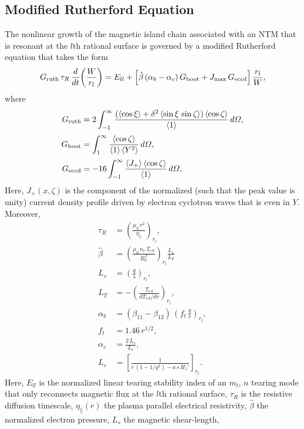 \documentclass[12pt,prb,aps]{revtex4-1}
\begin{document}
\subsection{Modified Rutherford Equation}
The nonlinear growth of the magnetic island  chain associated with an NTM that is resonant at the $l$th rational surface is governed by a modified Rutherford equation that takes the form\,\cite{ntm1,ntm4,island,boot,fitz}
\begin{equation}\label{eruth}
G_{\rm ruth}\,\tau_R\,\frac{d}{dt}\!\left(\frac{W}{r_l}\right) = E_{ll} +\left[\hat{\beta}\,(\alpha_b-\alpha_c)\,G_{\rm boot} + J_{\rm max}\,G_{\rm eccd}\right]
\frac{r_l}{W},
\end{equation}
where
\begin{align}
G_{\rm ruth} &= 2\int_{-1}^\infty \frac{(\langle\cos\xi\rangle + \delta^2\,\langle \sin\xi\,\sin\zeta\rangle)\,\langle \cos\zeta\rangle}{\langle 1\rangle}\,d{\mit\Omega},\\[0.5ex]
G_{\rm boot} &= \int_1^\infty \frac{\langle \cos\zeta\rangle}{\langle 1\rangle\,\langle Y^2\rangle}\,d{\mit\Omega},\\[0.5ex]
G_{\rm eccd} &= - 16\int_{-1}^\infty \frac{\langle J_+\rangle\,\langle \cos\zeta\rangle}{\langle 1\rangle}\,d{\mit\Omega},\label{geccd}
\end{align}
Here,  $J_+(x,\zeta)$ is the component of the normalized  (such that the peak value is unity) current density profile driven by electron cyclotron waves that is even in $Y$. 
Moreover, 
\begin{align}
\tau_R &= \left(\frac{\mu_0\,r^2}{\eta_\parallel}\right)_{r_l},\\[0.5ex]
\hat{\beta} &= \left(\frac{\mu_0\,n_e\,T_{e\,0}}{B_0^{\,2}}\right)_{r_l}\frac{L_s}{L_T}\,\\[0.5ex]
L_s&=\left(\frac{q}{s}\right)_{r_l},\\[0.5ex]
L_T &= -\left(\frac{T_{e\,0}}{dT_{e\,0}/dr}\right)_{r_l},\\[0.5ex]
\alpha_b &=(\beta_{11}-\beta_{12})\, \left(f_t\,\frac{q}{r}\right)_{r_l},\\[0.5ex]
f_t&= 1.46\,r^{1/2},\\[0.5ex]
\alpha_c &= \frac{2\,L_s}{L_c},\\[0.5ex]
L_c &= \left[\frac{1}{r\,(1-1/q^2) -a\,s\,H_1'}\right]_{r_l}.
\end{align}
Here, $E_{ll}$ is the  normalized linear tearing stability index of an $m_l$, $n$ tearing mode
 that only reconnects magnetic flux at the $l$th rational surface,\cite{tear5} $\tau_R$ is the resistive diffusion timescale, $\eta_\parallel(r)$  the plasma parallel electrical resistivity, $\hat{\beta}$ the normalized electron pressure, $L_s$  the magnetic shear-length, 
\end{document}

